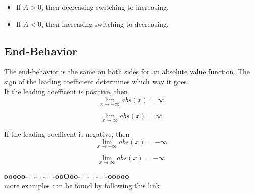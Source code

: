 \documentclass{ximera}
\begin{document}
\begin{itemize}
  \item If $A > 0$, then decreasing switching to increasing.
  \item If $A < 0$, then increasing switching to decreasing.
\end{itemize}









\subsection*{End-Behavior}


The end-behavior is the same on both sides for an absolute value function. The sign of the leading coefficient determines which way it goes.\\


If the leading coefficent is positive, then 
\[
\lim_{x \to -\infty} abs(x) = \infty 
\]
 
\[
\lim_{x \to \infty} abs(x) = \infty 
\]







If the leading coefficent is negative, then 
\[
\lim_{x \to -\infty} abs(x) = -\infty 
\]
 
\[
\lim_{x \to \infty} abs(x) = -\infty 
\]





















\begin{center}
\textbf{\textcolor{green!50!black}{ooooo-=-=-=-ooOoo-=-=-=-ooooo}} \\

more examples can be found by following this link\\ 

\end{center}
\end{document}
